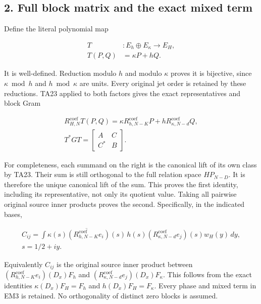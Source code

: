 \subsection{2. Full block matrix and the exact mixed term}\label{EM-full-block-matrix-and-the-exact-mixed-term}

Define the literal polynomial map

\[
\begin{aligned}T&:E_h\oplus E_\kappa\longrightarrow E_H,\\T(P,Q)&=\kappa P+hQ.\end{aligned}\tag{EM1}
\]

It is well-defined. Reduction modulo \(h\) and modulo \(\kappa\) proves it is
bijective, since \(\kappa\bmod h\) and \(h\bmod\kappa\) are units. Every original
jet order is retained by these reductions. TA23 applied to both factors
gives the exact representatives and block Gram

\[
\begin{gathered}R_{H,N}^{\mathrm{coef}}T(P,Q)=\kappa R_{h,N-K}^{\mathrm{coef}}P+hR_{\kappa,N-d}^{\mathrm{coef}}Q,\\T^*GT=\begin{bmatrix}A&C\\C^*&B\end{bmatrix}.\end{gathered}\tag{EM2}
\]

For completeness, each summand on the right is the canonical lift of
its own class by TA23. Their sum is still orthogonal to the full relation
space \(HP_{N-D}\). It is therefore the unique canonical lift of the sum.
This proves the first identity, including its representative, not only
its quotient value. Taking all pairwise original source inner products
proves the second. Specifically, in the indicated bases,

\[
\begin{gathered}C_{ij}=\int\overline{\kappa(s)(R_{h,N-K}^{\mathrm{coef}}e_i)(s)}\,h(s)(R_{\kappa,N-d}^{\mathrm{coef}}e_j)(s)w_H(y)\,dy,\\s=1/2+iy.\end{gathered}\tag{EM3}
\]

Equivalently \(C_{ij}\) is the original source inner product between
\((R_{h,N-K}^{\mathrm{coef}}e_i)\allowbreak(D_x)F_h\) and
\((R_{\kappa,N-d}^{\mathrm{coef}}e_j)\allowbreak(D_x)F_\kappa\). This follows from the exact identities
\(\kappa(D_x)F_H=F_h\) and \(h(D_x)F_H=F_\kappa\). Every phase and mixed term in
EM3 is retained. No orthogonality of distinct zero blocks is assumed.

